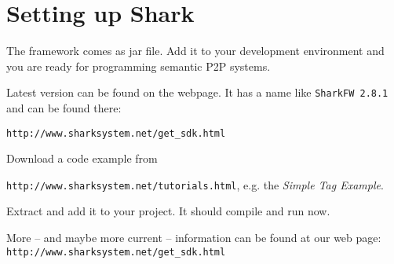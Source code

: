 \chapter{Setting up Shark}
The framework comes as jar file. Add it to your development environment and you are ready for programming semantic P2P systems. 

Latest version can be found on the webpage. It has a name like
{\verb|SharkFW 2.8.1|} and can be found there:

{\verb|http://www.sharksystem.net/get_sdk.html|}

Download a code example from 

{\verb|http://www.sharksystem.net/tutorials.html|}, e.g.
the {\it Simple Tag Example}.

Extract and add it to your project. It should compile and run now.

More -- and maybe more current -- information can be found at our web page:
{\tt http://www.sharksystem.net/get\_sdk.html} 
